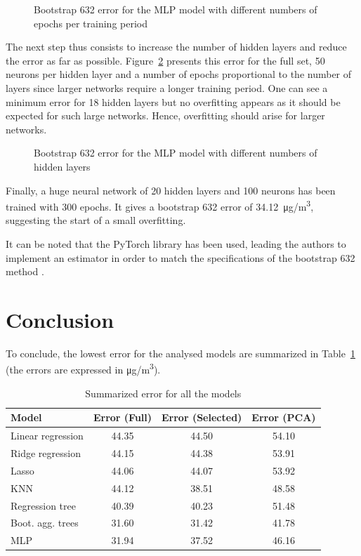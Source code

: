 \documentclass[journal,11pt]{IEEEtran}
\begin{document}
\begin{figure}[H]
    \centering
    
    \caption{Bootstrap 632 error for the MLP model with different numbers of epochs per training period}
    \label{fig:MLP_epochs}
\end{figure}

The next step thus consists to increase the number of hidden layers and reduce the error as far as possible. Figure~\ref{fig:MLP_layers} presents this error for the full set, 50 neurons per hidden layer and a number of epochs proportional to the number of layers since larger networks require a longer training period. One can see a minimum error for 18 hidden layers but no overfitting appears as it should be expected for such large networks. Hence, overfitting should arise for larger networks.

\begin{figure}[H]
    \centering
    
    \caption{Bootstrap 632 error for the MLP model with different numbers of hidden layers}
    \label{fig:MLP_layers}
\end{figure}

Finally, a huge neural network of 20 hidden layers and 100 neurons has been trained with 300 epochs. It gives a bootstrap 632 error of \SI{34.12}{\micro g/m^3}, suggesting the start of a small overfitting.

It can be noted that the PyTorch library has been used, leading the authors to implement an estimator in order to match the specifications of the bootstrap 632 method \cite{NEURIPS2019_9015}.

\section{Conclusion}
\label{Conclusion}

To conclude, the lowest error for the analysed models are summarized in Table~\ref{tab:sum} (the errors are expressed in \si{\micro g/m^3}).

\begin{table}[H]
\setlength{}
\centering
\begin{tabular}{lccc}
\hline
 Model &  Error (Full) &  Error (Selected) &  Error (PCA)\\ \hline
 Linear regression & 44.35 & 44.50 & 54.10 \\
 Ridge regression & 44.15 & 44.38 & 53.91  \\ 
 Lasso & 44.06 & 44.07 & 53.92 \\
 KNN & 44.12 & 38.51 & 48.58 \\
 Regression tree & 40.39 & 40.23 & 51.48 \\
 Boot. agg. trees & 31.60 & 31.42 & 41.78 \\
 MLP & 31.94 & 37.52 & 46.16 \\ \hline
\end{tabular}
\vspace*{3mm}
\caption{Summarized error for all the models}
\label{tab:sum}
\end{table}
\end{document}
